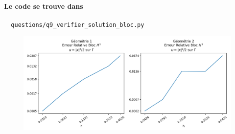 \documentclass[french, 12pt, a4paper]{article}
\begin{document}
\paragraph{Le code se trouve dans}
\begin{verbatim}
  questions/q9_verifier_solution_bloc.py
\end{verbatim}

\begin{figure}[H]
\centering
\includegraphics[scale=0.55]{figure_9.png}
\end{figure}

\end{document}
